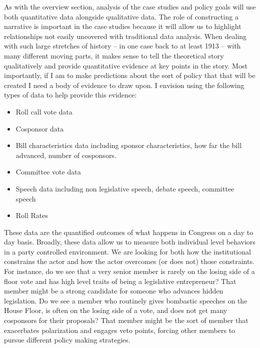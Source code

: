 \documentclass[12pt]{article}
\begin{document}
As with the overview section, analysis of the case studies and policy goals will use both quantitative data alongside qualitative data. The role of constructing a narrative is important in the case studies because it will allow us to highlight relationships not easily uncovered with traditional data analysis. When dealing with such large stretches of history -- in one case back to at least 1913 -- with many different moving parts, it makes sense to tell the theoretical story qualitatively and provide quantitative evidence at key points in the story. Most importantly, if I am to make predictions about the sort of policy that that will be created I need a body of evidence to draw upon. I envision using the following types of data to help provide this evidence:
\begin{itemize}
\setlength{\itemsep}{-5pt}
\item Roll call vote data
\item Cosponsor data
\item Bill characteristics data including sponsor characteristics, how far the bill advanced, number of cosponsors.
\item Committee vote data
\item Speech data including non legislative speech, debate speech, committee speech
\item Roll Rates
\end{itemize}
These data are the quantified outcomes of what happens in Congress on a day to day basis. Broadly, these data allow us to measure both individual level behaviors in a party controlled environment. We are looking for both how the institutional constrains the actor and how the actor overcomes (or does not) those constraints. For instance, do we see that a very senior member is rarely on the losing side of a floor vote and has high level traits of being a legislative entrepreneur? That member might be a strong candidate for someone who advances hidden legislation. Do we see a member who routinely gives bombastic speeches on the House Floor, is often on the losing side of a vote, and does not get many cosponsors for their proposals? That member might be the sort of member that exacerbates polarization and engages veto points, forcing other members to pursue different policy making strategies.
\end{document}

